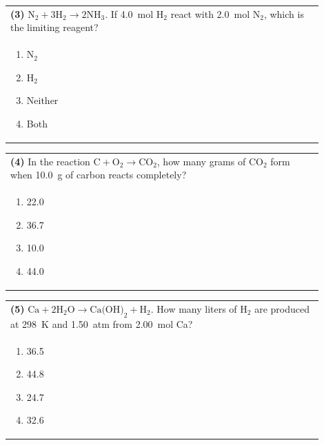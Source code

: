 \documentclass{article}
\begin{document}
\vspace{0.2cm}
\noindent\begin{tabular}{|p{0.9\linewidth}|}
\hline
\textbf{(3)} $\text{N}_2 + 3\text{H}_2 \rightarrow 2\text{NH}_3$. If 4.0~mol H$_2$ react with 2.0~mol N$_2$, which is the limiting reagent?\\[0.2cm]

\begin{minipage}[t]{0.85\linewidth}
\begin{enumerate}[label=\alph*.]
\item N$_2$
\item H$_2$
\item Neither
\item Both
\end{enumerate}
\end{minipage}\\[0.2cm]
\hline
\end{tabular}

\vspace{0.2cm}
\noindent\begin{tabular}{|p{0.9\linewidth}|}
\hline
\textbf{(4)} In the reaction $\text{C} + \text{O}_2 \rightarrow \text{CO}_2$, how many grams of CO$_2$ form when 10.0~g of carbon reacts completely?\\[0.2cm]

\begin{minipage}[t]{0.85\linewidth}
\begin{enumerate}[label=\alph*.]
\item 22.0
\item 36.7
\item 10.0
\item 44.0
\end{enumerate}
\end{minipage}\\[0.2cm]
\hline
\end{tabular}
\newpage

\noindent\begin{tabular}{|p{0.9\linewidth}|}
\hline
\textbf{(5)} $\text{Ca} + 2\text{H}_2\text{O} \rightarrow \text{Ca(OH)}_2 + \text{H}_2$. How many liters of H$_2$ are produced at 298~K and 1.50~atm from 2.00~mol Ca?\\[0.2cm]

\begin{minipage}[t]{0.85\linewidth}
\begin{enumerate}[label=\alph*.]
\item 36.5
\item 44.8
\item 24.7
\item 32.6
\end{enumerate}
\end{minipage}\\[0.2cm]
\hline
\end{tabular}
\end{document}
